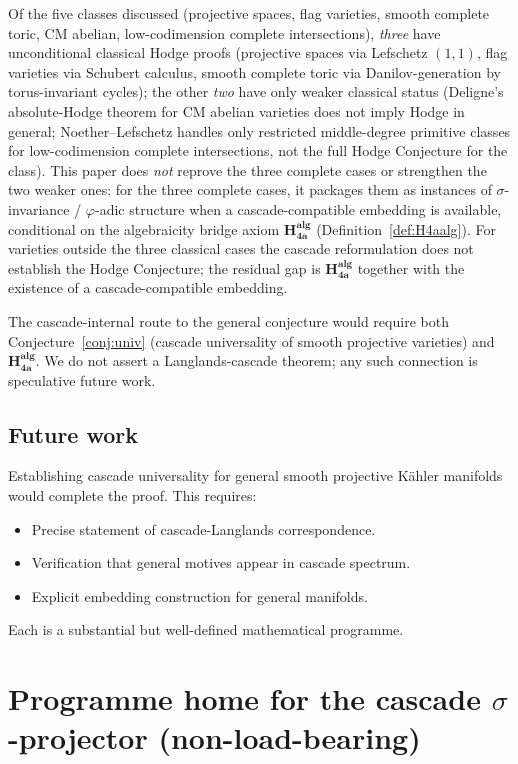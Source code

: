 \documentclass[11pt, a4paper]{amsart}
\theoremstyle{definition}
\newcommand{\pphi}{\varphi}
\begin{document}
Of the five classes discussed (projective spaces, flag varieties,
smooth complete toric, CM abelian, low-codimension complete
intersections), \emph{three} have unconditional classical Hodge
proofs (projective spaces via Lefschetz $(1,1)$, flag varieties
via Schubert calculus, smooth complete toric via
Danilov-generation by torus-invariant cycles); the other
\emph{two} have only weaker classical status (Deligne's
absolute-Hodge theorem for CM abelian varieties does not imply
Hodge in general; Noether--Lefschetz handles only restricted
middle-degree primitive classes for low-codimension complete
intersections, not the full Hodge Conjecture for the class). This
paper does \emph{not} reprove the three complete cases or
strengthen the two weaker ones: for the three complete cases, it
packages them as instances of $\sigma$-invariance / $\pphi$-adic
structure when a cascade-compatible embedding is available,
conditional on the algebraicity bridge axiom
$\mathbf{H_{4a}^{alg}}$ (Definition~\ref{def:H4aalg}). For
varieties outside the three classical cases the cascade
reformulation does not establish the Hodge Conjecture; the
residual gap is $\mathbf{H_{4a}^{alg}}$ together with the
existence of a cascade-compatible embedding.

The cascade-internal route to the general conjecture would
require both Conjecture~\ref{conj:univ} (cascade universality of
smooth projective varieties) and $\mathbf{H_{4a}^{alg}}$. We do
not assert a Langlands-cascade theorem; any such connection is
speculative future work.

\subsection{Future work}

Establishing cascade universality for general smooth projective Kähler
manifolds would complete the proof. This requires:
\begin{itemize}
\item Precise statement of cascade-Langlands correspondence.
\item Verification that general motives appear in cascade spectrum.
\item Explicit embedding construction for general manifolds.
\end{itemize}

Each is a substantial but well-defined mathematical programme.

\section{Programme home for the cascade $\sigma$-projector (non-load-bearing)}\label{sec:aria_home}
\end{document}
